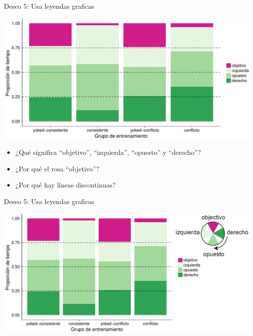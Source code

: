 \documentclass[ignorenonframetext,]{beamer}
\providecommand{\tightlist}{%
  \setlength{\itemsep}{0pt}\setlength{\parskip}{0pt}}
\begin{document}
\begin{frame}{Deseo 5: Usa leyendas graficas}

\includegraphics{../figures/talk/timespent-1.pdf}

\begin{itemize}[<+->]
\tightlist
\item
  ¿Qué significa ``objetivo'', ``izquierda'', ``opuesto'' y ``derecho''?
\item
  ¿Por qué el rosa ``objetivo''?
\item
  ¿Por qué hay líneas discontinuas?
\end{itemize}

\end{frame}

\begin{frame}{Deseo 5: Usa leyendas graficas}

\includegraphics{../figures/talk/timespent2-1.pdf}


\end{frame}
\end{document}
